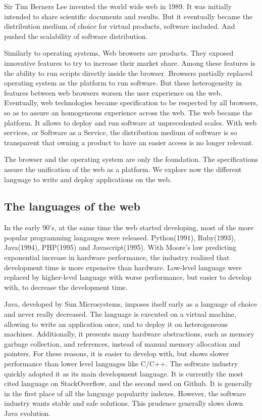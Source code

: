 Sir Tim Berners Lee invented the world wide web in 1989.
It was initially intended to share scientific documents and results.
But it eventually became the distribution medium of choice for virtual products, software included.
And pushed the scalability of software distribution.

Similarly to operating systems, Web browsers are products.
They exposed innovative features to try to increase their market share.
Among these features is the ability to run scripts directly inside the browser.
Browsers partially replaced operating system as the platform to run software.
But these heterogeneity in features between web browsers worsen the user experience on the web.
Eventually, web technologies became specification to be respected by all browsers, so as to assure an homogeneous experience across the web.
The web became the platform.
It allows to deploy and run software at unprecedented scales.
With web services, or Software as a Service, the distribution medium of software is so transparent that owning a product to have an easier access is no longer relevant.

The browser and the operating system are only the foundation.
The specifications assure the unification of the web as a platform.
We explore now the different language to write and deploy applications on the web.


\subsection{The languages of the web}

In the early 90's, at the same time the web started developing, most of the more popular programming langauges were released.
Python(1991), Ruby(1993), Java(1994), PHP(1995) and  Javascript(1995).
With Moore's law predicting exponential increase in hardware performance, the industry realized that development time is more expensive than hardware.
Low-level language were replaced by higher-level language with worse performance, but easier to develop with, to decrease the development time.

Java, developed by Sun Microsystems, imposes itself early as a language of choice and never really decreased.
The language is executed on a virtual machine, allowing to write an application once, and to deploy it on heterogeneous machines.
Additionally, it presents many hardware abstractions, such as memory garbage collection, and references, instead of manual memory allocation and pointers.
For these reasons, it is easier to develop with, but shows slower performance than lower level languages like C/C++.
The software industry quickly adopted it as its main development language.
It is currently the most cited language on StackOverflow, and the second used on Github.
It is generally in the first place of all the language popularity indexes.
However, the software industry wants stable and safe solutions.
This prudence generally slows down Java evolution.

